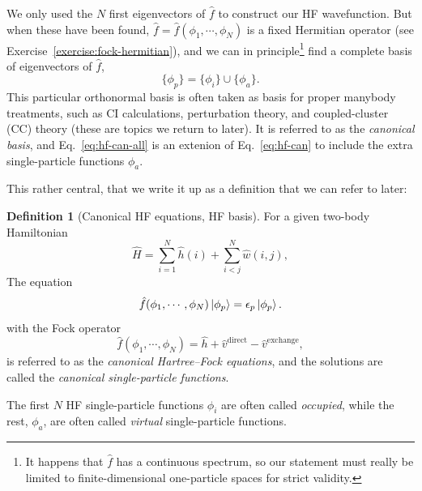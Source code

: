 \documentclass{report}
\theoremstyle{plain}
\theoremstyle{definition}
\newtheorem{definition}{Definition}[chapter]
\begin{document}
We only used the $N$ first eigenvectors of $\hat{f}$ to construct our
HF wavefunction. But when these have been found, $\hat{f}=
\hat{f}(\phi_1,\cdots,\phi_N)$ is a fixed Hermitian operator (see Exercise~\ref{exercise:fock-hermitian}), and we can in principle\footnote{It happens
  that $\hat{f}$ has a continuous spectrum, so our statement must
  really be limited to finite-dimensional one-particle spaces for
  strict validity.} find a complete basis of eigenvectors of $\hat{f}$,
\begin{equation}
  \{ \phi_p \} = \{\phi_i \} \cup \{\phi_a\}.
\end{equation}
This particular orthonormal basis is often taken as basis for proper
manybody treatments, such as CI calculations, perturbation theory, and
coupled-cluster (CC) theory (these are topics we return to later). It
is referred to as the \emph{canonical basis}, and 
Eq.~\eqref{eq:hf-can-all} is an extenion of Eq.~\eqref{eq:hf-can} to
include the extra single-particle functions $\phi_a$.

This rather central, that we write it up as a definition that we can
refer to later:
\begin{definition}[Canonical HF equations, HF basis]\label{def:hf-can}
  For a given two-body Hamiltonian
  \begin{equation}
   \hat{H} = \sum_{i=1}^N \hat{h}(i) + \sum_{i<j}^N \hat{w}(i,j),
 \end{equation}
 The equation
 \begin{equation}
   \hat{f}(\phi_1,\cdots,\phi_N)\ket{\phi_p} = \epsilon_p \ket{\phi_p}. \label{eq:hf-can-all}
  \end{equation}
  with the Fock operator
  \begin{equation}
    \hat{f}(\phi_1,\cdots,\phi_N) = \hat{h} + \hat{v}^\text{direct} -
    \hat{v}^\text{exchange},
  \end{equation} 
  is referred to as the \emph{canonical Hartree--Fock
    equations}, and the solutions are called the \emph{canonical
    single-particle functions}.

  The first $N$ HF single-particle functions $\phi_i$ are often called
  \emph{occupied}, while the rest, $\phi_a$, are often called
  \emph{virtual} single-particle functions.
\end{definition}
\end{document}
